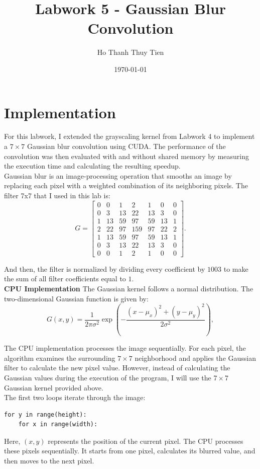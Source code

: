 \documentclass{article}
\title{Labwork 5 - Gaussian Blur Convolution}
\author{Ho Thanh Thuy Tien}
\date{\today}
\begin{document}
\maketitle

\section{Implementation}
For this labwork, I extended the grayscaling kernel from Labwork 4 to implement a $7\times7$ Gaussian blur convolution using CUDA. The performance of the convolution was then evaluated with and without shared memory by measuring the execution time and calculating the resulting speedup.\\ 


Gaussian blur is an image-processing operation that smooths an image by replacing each pixel with a weighted combination of its neighboring pixels.
The filter 7x7 that I used in this lab is:
\[ G = \begin{bmatrix} 0 & 0 & 1 & 2 & 1 & 0 & 0 \\ 0 & 3 & 13 & 22 & 13 & 3 & 0 \\ 1 & 13 & 59 & 97 & 59 & 13 & 1 \\ 2 & 22 & 97 & 159 & 97 & 22 & 2 \\ 1 & 13 & 59 & 97 & 59 & 13 & 1 \\ 0 & 3 & 13 & 22 & 13 & 3 & 0 \\ 0 & 0 & 1 & 2 & 1 & 0 & 0 \end{bmatrix}. \]

And then, the filter is normalized by dividing every coefficient by $1003$ to make the sum of all filter coefficients equal to $1$.\\


\textbf{CPU Implementation}
The Gaussian kernel follows a normal distribution. The two-dimensional Gaussian function is given by: \[ G(x,y) = \frac{1}{2\pi\sigma^2} \exp\left( -\frac{(x-\mu_x)^2+(y-\mu_y)^2}{2\sigma^2} \right), \]

The CPU implementation processes the image sequentially. For each pixel, the algorithm examines the surrounding $7\times7$ neighborhood and applies the Gaussian filter to calculate the new pixel value. However, instead of calculating the Gaussian values during the execution of the program, I will use the $7\times7$ Gaussian kernel provided above.\\

The first two loops iterate through the image: 
\begin{verbatim} 
for y in range(height): 
    for x in range(width): 
\end{verbatim} 
Here, $(x,y)$ represents the position of the current pixel. The CPU processes these pixels sequentially. It starts from one pixel, calculates its blurred value, and then moves to the next pixel.\\
\end{document}
